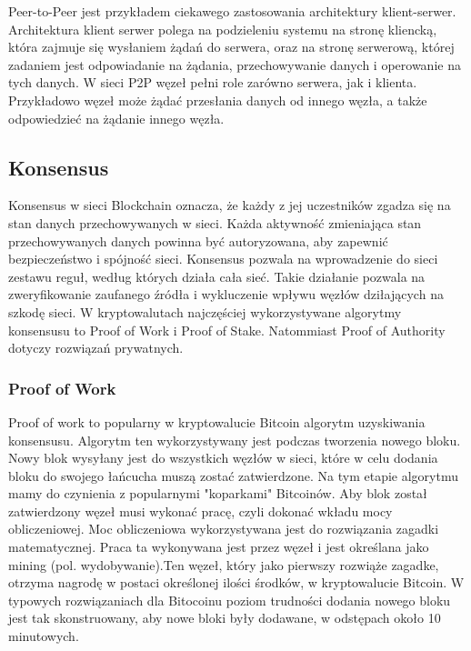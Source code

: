 \documentclass[a4paper,13pt]{report}
\begin{document}
Peer-to-Peer jest przykładem ciekawego zastosowania architektury klient-serwer. Architektura klient serwer polega na podzieleniu systemu na stronę kliencką, która zajmuje się wysłaniem żądań do serwera, oraz na stronę serwerową, której zadaniem jest odpowiadanie na żądania, przechowywanie danych i operowanie na tych danych. W sieci P2P węzeł pełni role zarówno serwera, jak i klienta. Przykładowo węzeł może żądać przesłania danych od innego węzła, a także odpowiedzieć na żądanie innego węzła.

\subsection{Konsensus}

Konsensus w sieci Blockchain oznacza, że każdy z jej uczestników zgadza się na stan danych przechowywanych w sieci. Każda aktywność zmieniająca stan przechowywanych danych powinna być autoryzowana, aby zapewnić bezpieczeństwo i spójność sieci. Konsensus pozwala na wprowadzenie do sieci zestawu reguł, według których działa cała sieć. Takie działanie pozwala na zweryfikowanie zaufanego źródła i wykluczenie wpływu węzłów dziłających na szkodę sieci. W kryptowalutach najczęściej wykorzystywane algorytmy konsensusu to Proof of Work i Proof of Stake. Natommiast Proof of Authority dotyczy rozwiązań prywatnych.

\subsubsection{Proof of Work}

Proof of work to popularny w kryptowalucie Bitcoin algorytm uzyskiwania konsensusu. Algorytm ten wykorzystywany jest podczas tworzenia nowego bloku. Nowy blok wysyłany jest do wszystkich węzłów w sieci, które w celu dodania bloku do swojego łańcucha muszą zostać zatwierdzone. Na tym etapie algorytmu mamy do czynienia z popularnymi "koparkami" Bitcoinów. Aby blok został zatwierdzony węzeł musi wykonać pracę, czyli dokonać wkładu mocy obliczeniowej. Moc obliczeniowa wykorzystywana jest do rozwiązania zagadki matematycznej. Praca ta wykonywana jest przez węzeł i jest określana jako mining (pol. wydobywanie).Ten węzeł, który jako pierwszy rozwiąże zagadke, otrzyma nagrodę w postaci określonej ilości środków, w kryptowalucie Bitcoin. W typowych rozwiązaniach dla Bitocoinu poziom trudności dodania nowego bloku jest tak skonstruowany, aby nowe bloki były dodawane, w odstępach około 10 minutowych\cite{pow-bitcoin}. 
\end{document}
